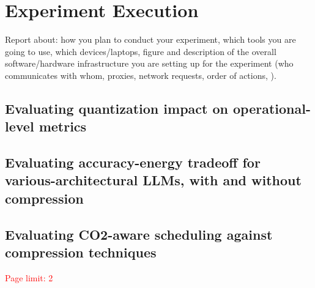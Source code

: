 \section{Experiment Execution}\label{sec:experiments}
Report about: how you plan to conduct your experiment, which tools you are going to use, which devices/laptops, figure and description of the overall software/hardware infrastructure you are setting up for the experiment (\eg who communicates with whom, proxies, network requests, order of actions, \etc). 


\subsection{Evaluating quantization impact on operational-level metrics}\label{sec:experiments:operational-level} \label{sec:exp1}

\subsection{Evaluating accuracy-energy tradeoff for various-architectural LLMs, with and without compression}\label{sec:experiments:accuracy-energy} \label{sec:exp2}

\subsection{Evaluating CO2-aware scheduling against compression techniques}\label{sec:experiments:co2-aware} \label{sec:exp3}


\textcolor{red}{Page limit: 2}

